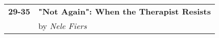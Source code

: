 \documentclass{article}
\begin{document}
\begin{tcolorbox}
\begin{flushleft}
\begin{tabularx}{\textwidth}{p{} >{\RaggedLeft\arraybackslash\large}X}
      \\
      \textbf{29-35} & \textbf{"Not Again": When the Therapist Resists}                                                                                                                             \\
                     & by \textit{Nele Fiers}                                                                                                                                                       \\
    \end{tabularx}
  \end{flushleft}

\end{tcolorbox}
\end{document}
